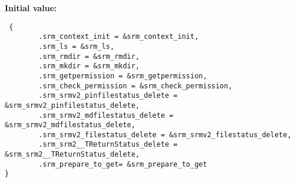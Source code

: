 \textbf{Initial value:}

\begin{Code}\begin{verbatim} { 
        .srm_context_init = &srm_context_init,
        .srm_ls = &srm_ls,
        .srm_rmdir = &srm_rmdir,
        .srm_mkdir = &srm_mkdir,
        .srm_getpermission = &srm_getpermission,
        .srm_check_permission = &srm_check_permission,
        .srm_srmv2_pinfilestatus_delete = &srm_srmv2_pinfilestatus_delete,
        .srm_srmv2_mdfilestatus_delete = &srm_srmv2_mdfilestatus_delete,
        .srm_srmv2_filestatus_delete = &srm_srmv2_filestatus_delete,
        .srm_srm2__TReturnStatus_delete = &srm_srm2__TReturnStatus_delete,
        .srm_prepare_to_get= &srm_prepare_to_get
}
\end{verbatim}\end{Code}
